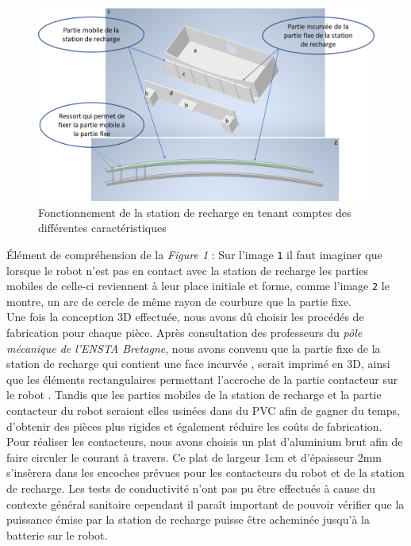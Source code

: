 \documentclass[french]{rapportENSTAB}
\begin{document}
\begin{figure}[H]
    \centering
    \includegraphics[scale=0.6]{images/station de recharge/fonctionnement station de rehcrage.png}
    \caption{Fonctionnement de la station de recharge en tenant comptes des différentes caractéristiques}
    \label{fig:station de recharge}
\end{figure}
Élément de compréhension de la \textit{Figure 1} : Sur l’image \texttt{1} il faut imaginer que lorsque le robot n’est pas en contact avec la station de recharge les parties mobiles de celle-ci reviennent à leur place initiale et forme, comme l’image \texttt{2} le montre, un arc de cercle de même rayon de courbure que la partie fixe.\\

Une fois la conception 3D effectuée, nous avons dû choisir les procédés de fabrication pour chaque pièce. Après consultation des professeurs du \textit{pôle mécanique de l'ENSTA Bretagne}, nous avons convenu que la partie fixe de la station de recharge qui contient une face incurvée , serait imprimé en 3D, ainsi que les éléments rectangulaires permettant l'accroche de la partie contacteur sur le robot . Tandis que les parties mobiles de la station de recharge  et la partie contacteur du robot  seraient elles usinées dans du PVC afin de gagner du temps, d'obtenir des pièces plus rigides et également réduire les coûts de fabrication. \\

Pour réaliser les contacteurs, nous avons choisis un plat d'aluminium brut afin de faire circuler le courant à travers. Ce plat de largeur 1cm et d'épaisseur 2mm s'insèrera dans les encoches prévues pour les contacteurs du robot et de la station de recharge. Les tests de conductivité n'ont pas pu être effectués à cause du contexte général sanitaire cependant il paraît important de pouvoir vérifier que la puissance émise par la station de recharge puisse être acheminée jusqu'à la batterie sur le robot. \\
\end{document}
